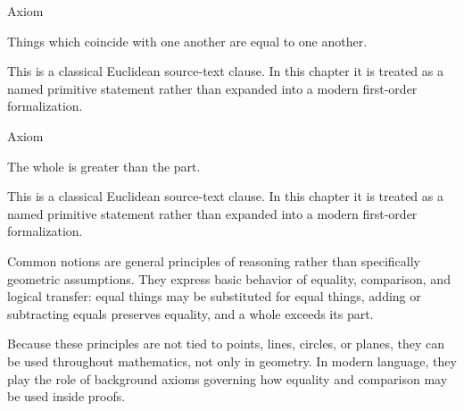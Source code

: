 \begin{lra-not-visible}
\NoLocalDependencies
\end{lra-not-visible}

\begin{axiombox}{Axiom}
\begin{axiom}
\label{ax:euclid-common-notion-coinciding-things-equal}
Things which coincide with one another are equal to one another.
\end{axiom}
\end{axiombox}
\begin{remark*}
This is a classical Euclidean source-text clause. In this chapter it is treated
as a named primitive statement rather than expanded into a modern first-order
formalization.
\end{remark*}

\begin{lra-not-visible}
\NoLocalDependencies
\end{lra-not-visible}

\begin{axiombox}{Axiom}
\begin{axiom}
\label{ax:euclid-common-notion-whole-greater-than-part}
The whole is greater than the part.
\end{axiom}
\end{axiombox}
\begin{remark*}
This is a classical Euclidean source-text clause. In this chapter it is treated
as a named primitive statement rather than expanded into a modern first-order
formalization.
\end{remark*}

\begin{lra-not-visible}
\NoLocalDependencies
\end{lra-not-visible}

\begin{remark*}[Exposition]
Common notions are general principles of reasoning rather than specifically
geometric assumptions. They express basic behavior of equality, comparison, and
logical transfer: equal things may be substituted for equal things, adding or
subtracting equals preserves equality, and a whole exceeds its part.

Because these principles are not tied to points, lines, circles, or planes,
they can be used throughout mathematics, not only in geometry. In modern
language, they play the role of background axioms governing how equality and
comparison may be used inside proofs.
\end{remark*}
